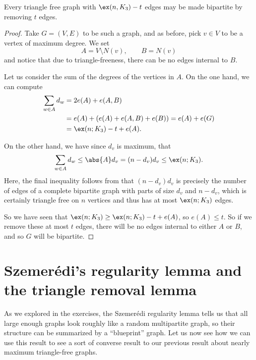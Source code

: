 \documentclass[nobib]{tufte-handout}
\begin{document}
\begin{theorem}
    Every triangle free graph with $\ex(n, K_3) - t$ edges may be made bipartite by removing $t$ edges.

    \begin{proof}
        Take $G = (V,E)$ to be such a graph, and as before, pick $v \in V$ to be a vertex of maximum degree. We set
        $$A = V \setminus N(v), \qquad B = N(v)$$
        and notice that due to triangle-freeness, there can be no edges internal to $B$.

        Let us consider the sum of the degrees of the vertices in $A$. On the one hand, we can compute
        \begin{align*}
            \sum_{w \in A} d_w &= 2e(A) + e(A,B)\\
            &= e(A) + \left(e(A) + e(A,B) + e(B)\right) = e(A) + e(G)\\
            &= \ex(n; K_3) - t + e(A).
        \end{align*}

        On the other hand, we have since $d_v$ is maximum, that
        \begin{align*}
            \sum_{w \in A} d_w \leq \abs{A}d_v = (n-d_v)d_v \leq \ex(n; K_3).
        \end{align*}
        Here, the final inequality follows from that $(n-d_v)d_v$ is precisely the number of edges of a complete bipartite graph with parts of size $d_v$ and $n-d_v$, which is certainly triangle free on $n$ vertices and thus has at most $\ex(n; K_3)$ edges.

        So we have seen that $\ex(n; K_3) \geq \ex(n; K_3) - t + e(A)$, so $e(A) \leq t$. So if we remove these at most $t$ edges, there will be no edges internal to either $A$ or $B$, and so $G$ will be bipartite.
    \end{proof}
\end{theorem}

\section{Szemerédi's regularity lemma and the triangle removal lemma}

As we explored in the exercises, the Szemerédi regularity lemma tells us that all large enough graphs look roughly like a random multipartite graph, so their structure can be summarized by a ``blueprint'' graph. Let us now see how we can use this result to see a sort of converse result to our previous result about nearly maximum triangle-free graphs.
\end{document}
